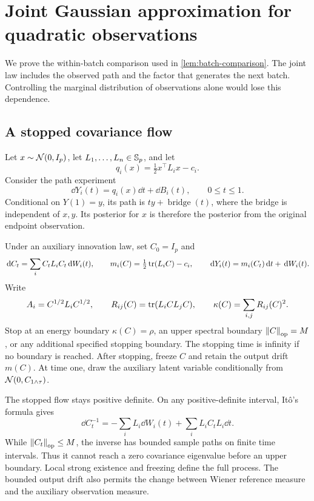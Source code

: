 \section{Joint Gaussian approximation for quadratic observations}
\label{app:projection}

We prove the within-batch comparison used in \cref{lem:batch-comparison}. The joint law includes the observed path and the factor that generates the next batch. Controlling the marginal distribution of observations alone would lose this dependence.

\subsection{A stopped covariance flow}

Let $x\sim\mathcal N(0,I_p)$, let $L_1,\ldots,L_n\in\mathbb S_p$, and let
\[
 q_i(x)=\tfrac12x^\top L_i x-c_i.
\]
Consider the path experiment
\begin{equation}
 \dd Y_i(t)=q_i(x)\dd t+\dd B_i(t),\qquad 0\le t\le1.
 \label{eq:quadratic-path}
\end{equation}
Conditional on $Y(1)=y$, its path is $ty+\operatorname{bridge}(t)$,
where the bridge is independent of $x,y$. Its posterior for $x$ is therefore the posterior from the original endpoint observation.

Under an auxiliary innovation law, set $C_0=I_p$ and
\begin{equation}
 \,\mathrm d C_t=\sum_i C_tL_iC_t\,\mathrm d W_i(t),\qquad
 m_i(C)=\tfrac12\operatorname{tr}(L_iC)-c_i,\qquad
 \,\mathrm d Y_i(t)=m_i(C_t)\,\mathrm d t+\,\mathrm d W_i(t).
 \label{eq:generic-flow}
\end{equation}
Write
\[
 A_i=C^{1/2}L_iC^{1/2},\qquad
 R_{ij}(C)=\operatorname{tr}(L_iCL_jC),\qquad
 \kappa(C)=\sum_{i,j}R_{ij}(C)^2.
\]
Stop at an energy boundary $\kappa(C)=\rho$, an upper spectral boundary
$\left\lVert C\right\rVert_{\mathrm{op}}=M$, or any additional specified stopping boundary.
The stopping time is infinity if no boundary is reached. After stopping, freeze $C$ and retain the output drift $m(C)$.
At time one, draw the auxiliary latent variable conditionally from $\mathcal N(0,C_{1\wedge\tau})$.

The stopped flow stays positive definite. On any positive-definite interval, It\^o's formula gives
\begin{equation}
 \dd C_t^{-1}
 =-\sum_iL_i\dd W_i(t)+\sum_iL_iC_tL_i\dd t.
 \label{eq:inverse-flow}
\end{equation}
While $\left\lVert C_t\right\rVert_{\mathrm{op}}\le M$, the inverse has bounded sample paths on finite time intervals. Thus it cannot reach a zero covariance eigenvalue before an upper boundary. Local strong existence and freezing define the full process. The bounded output drift also permits the change between Wiener reference measure and the auxiliary observation measure.

